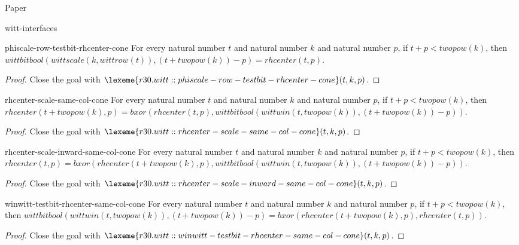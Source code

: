 \begin{lexlean}{Paper}
\begin{section}{witt-interfaces}
  \begin{theorem}{phiscale-row-testbit-rhcenter-cone}
  For every natural number \(t\) and natural number \(k\) and natural number \(p\), if \(t + p < twopow(k)\), then \(wittbitbool(wittscale(k, wittrow(t)), (t + twopow(k)) - p) = rhcenter(t, p)\).
  \begin{proof}
  Close the goal with \(\lexeme{r30.witt::phiscale-row-testbit-rhcenter-cone}(t, k, p)\).
  \end{proof}
  \end{theorem}

  \begin{theorem}{rhcenter-scale-same-col-cone}
  For every natural number \(t\) and natural number \(k\) and natural number \(p\), if \(t + p < twopow(k)\), then \(rhcenter(t + twopow(k), p) = bxor(rhcenter(t, p), wittbitbool(wittwin(t, twopow(k)), (t + twopow(k)) - p))\).
  \begin{proof}
  Close the goal with \(\lexeme{r30.witt::rhcenter-scale-same-col-cone}(t, k, p)\).
  \end{proof}
  \end{theorem}

  \begin{theorem}{rhcenter-scale-inward-same-col-cone}
  For every natural number \(t\) and natural number \(k\) and natural number \(p\), if \(t + p < twopow(k)\), then \(rhcenter(t, p) = bxor(rhcenter(t + twopow(k), p), wittbitbool(wittwin(t, twopow(k)), (t + twopow(k)) - p))\).
  \begin{proof}
  Close the goal with \(\lexeme{r30.witt::rhcenter-scale-inward-same-col-cone}(t, k, p)\).
  \end{proof}
  \end{theorem}

  \begin{theorem}{winwitt-testbit-rhcenter-same-col-cone}
  For every natural number \(t\) and natural number \(k\) and natural number \(p\), if \(t + p < twopow(k)\), then \(wittbitbool(wittwin(t, twopow(k)), (t + twopow(k)) - p) = bxor(rhcenter(t + twopow(k), p), rhcenter(t, p))\).
  \begin{proof}
  Close the goal with \(\lexeme{r30.witt::winwitt-testbit-rhcenter-same-col-cone}(t, k, p)\).
  \end{proof}
  \end{theorem}


\end{section}
\end{lexlean}
